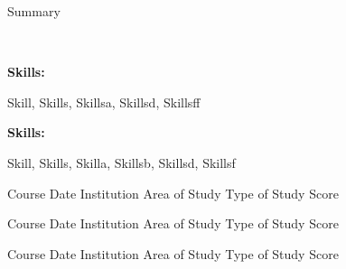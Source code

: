 \documentclass[9pt]{developercv} %
\begin{document}
    \begin{minipage}[t]{0.46\textwidth}
    \vspace{-6pt}

    Summary\\
    \end{minipage}
    \hfill
    \
    \begin{minipage}[t]{0.465\textwidth}
    \vspace{-6pt}
    
    
        
          \begin{minipage}[t]{0.2\textwidth}
          \textbf{Skills:}
          \end{minipage}
          \hfill
          \begin{minipage}[t]{0.73\textwidth}
          Skill, Skills, Skillsa, Skillsd, Skillsff
          \end{minipage}
          \vspace{4mm}
          
          \begin{minipage}[t]{0.2\textwidth}
          \textbf{Skills:}
          \end{minipage}
          \hfill
          \begin{minipage}[t]{0.73\textwidth}
          Skill, Skills, Skilla, Skillsb, Skillsd, Skillsf
          \end{minipage}
          \vspace{4mm}
          
        
    
    
    
\end{minipage}
    
    
    
    
    
    \vspace{-10 pt}
    \begin{entrylist}
    
    \entry
		{Course Date}
		{Institution}
		{Area of Study}
		{Type of Study \hfill \small Score}
    
    
    \entry
		{Course Date}
		{Institution}
		{Area of Study}
		{Type of Study \hfill \small Score}
    
    
    \entry
		{Course Date}
		{Institution}
		{Area of Study}
		{Type of Study \hfill \small Score}
    
    
    \end{entrylist}
    
\end{document}
